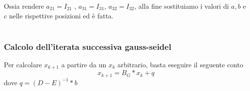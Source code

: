 Ossia rendere $a_{21} = I_{21} $ , $a_{31} = I_{31}  $, $a_{32} = I_{32} $, alla fine sostituiamo i valori di $a,b$ e $c$ nelle rispettive posizioni ed è fatta.
\\ \\
\noindent
\subsubsection{Calcolo dell'iterata successiva gauss-seidel}
\label{Calcolo dell'iterata successiva gauss-seidel}
Per calcolare $x_{k+1}$ a partire da un $x_k$ arbitrario, basta eseguire il seguente conto $$x_{k+1} = B_G * x_k + q$$
dove $q = (D-E)^{-1}*b$
